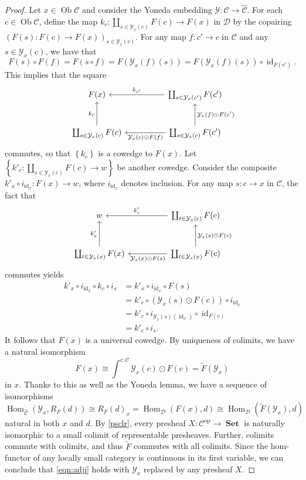 \documentclass[10pt,letterpaper,cm]{nupset}
\theoremstyle{definition}
\theoremstyle{theorem}
\theoremstyle{remark}
\DeclareMathOperator{\ob}{Ob}
\newcommand{\0}{\mathbf{0}}
\newcommand{\1}{\mathbf{1}}
\newcommand{\2}{\mathbf{2}}
\DeclareMathOperator{\op}{op}
\DeclareMathOperator{\set}{\mathbf{Set}}
\renewcommand{\c}{\mathscr{C}}
\renewcommand{\d}{\mathscr{D}}
\DeclareMathOperator{\Hom}{Hom}
\DeclareMathOperator{\idd}{id}
\begin{document}
\begin{proof}
Let $x\in \ob{\c}$ and consider the Yoneda embedding $\mathcal{Y} : \c \to \widehat{\c}$. For each $c\in \ob{\c}$, define the map $k_c :\coprod_{s\in \mathcal{Y}_x(c)}F(c) \to F(x)$ in $\d$ by the copairing $\left(F(s) :F(c)\to F(x)\right)_{s\in \mathcal{Y}_x(c)}$. For any map $f: c' \to c$ in $\c$ and any $s\in \mathcal{Y}_x(c)$, we have that 
$$F(s) \circ F(f) = F(s \circ f) =  F(\mathcal{Y}_x(f)(s)) = F(\mathcal{Y}_x(f)(s)) \circ \idd_{F(c')}.$$ This implies that the square
\[
\begin{tikzcd}[column sep=huge, row sep = large]
F(x)                                       & \coprod_{s\in \mathcal{Y}_x(c')}F(c') \arrow[l, "k_{c'}"']                                                \\
\coprod_{s\in \mathcal{Y}_x(c)}F(c) \arrow[u, "k_c"] & \coprod_{s\in \mathcal{Y}_x(c)}F(c') \arrow[l, "\mathcal{Y}_x(c)\odot F(f)"] \arrow[u, "\mathcal{Y}_x(f) \odot F(c')"']
\end{tikzcd}
\] commutes, so that $\left\{k_c\right\}$ is a cowedge  to $F(x)$. Let $\left\{k'_c : \coprod_{s\in \mathcal{Y}_x(c)}F(c) \to w \right\}$ be another cowedge. Consider the composite $k'_x \circ i_{\idd_x} : F(x) \to w$, where $ i_{\idd_x}$ denotes inclusion. For any map $s: c\to x$ in $\c$, the fact that
\[
\begin{tikzcd}[column sep=huge, row sep = large]
w                                           & \coprod_{t\in \mathcal{Y}_x(c)}F(c) \arrow[l, "k_{c}'"']                                          \\
\coprod_{t\in \mathcal{Y}_x(x)}F(x) \arrow[u, "k_x'"] & \coprod_{t\in \mathcal{Y}_x(x)}F(c) \arrow[l, "\mathcal{Y}_x(x)\odot F(s)"] \arrow[u, "\mathcal{Y}_x(s) \odot F(c)"']
\end{tikzcd}
\] commutes yields
\begin{align*}
k'_x \circ i_{\idd_x} \circ k_c \circ i_s & = k'_x \circ i_{\idd_x} \circ  F(s) 
\\ & =k'_c \circ \left( \mathcal{Y}_x(s) \odot F(c) \right) \circ i_{\idd_x}
\\ & =  k'_c \circ i_{\mathcal{Y}_x(s)(\idd_x)} \circ \idd_{F(c)} 
\\ & =k'_c \circ i_s.
\end{align*}
It follows that $F(x)$ is a universal cowedge. By uniqueness of colimits, we have a natural isomorphism $$F(x) \cong \int^{c:\c} \mathcal{Y}_x(c) \odot F(c) = \widetilde{F}(\mathcal{Y}_x)$$ in $x$. Thanks to this as well as the Yoneda lemma, we have a sequence of isomorphisms
\[
\label{eqn:adji} \Hom_{\widehat{\c}}(\mathcal{Y}_x, R_F(d)) \cong R_F(d)_x = \Hom_{\d}(F(x), d) \cong \Hom_{\d}(\widetilde{F}(\mathcal{Y}_x), d)
\tag{$\blacklozenge$}
\] natural in both $x$ and $d$. By \cref{psclr}, every presheaf $X : \c^{\op} \to \set$ is naturally isomorphic to a small colimit of representable presheaves. Further, colimits commute with colimits, and thus $\widetilde{F}$ commutes with all colimits. Since the hom-functor of any locally small category is continuous in its first variable, we can conclude that \eqref{eqn:adji} holds with $\mathcal{Y}_x$ replaced by any presheaf $X$.
\end{proof}
\end{document}

